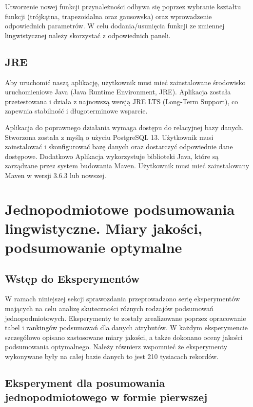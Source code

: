 \documentclass{article}
\begin{document}
\noindent Utworzenie nowej funkcji przynależności odbywa się poprzez wybranie kształtu funkcji (trójkątna, trapezoidalna oraz gausowska) oraz wprowadzenie odpowiednich parametrów. W celu dodania/usunięcia funkcji ze zmiennej lingwistycznej należy skorzystać z odpowiednich paneli.


\subsection{JRE}

\noindent Aby uruchomić naszą aplikację, użytkownik musi mieć zainstalowane środowisko uruchomieniowe Java (Java Runtime Environment, JRE). Aplikacja została przetestowana i działa z najnowszą wersją JRE LTS (Long-Term Support), co zapewnia stabilność i długoterminowe wsparcie.

\noindent Aplikacja do poprawnego działania wymaga dostępu do relacyjnej bazy danych. Stworzona została z myślą o użyciu PostgreSQL 13. Użytkownik musi zainstalować i skonfigurować bazę danych oraz dostarczyć odpowiednie dane dostępowe. Dodatkowo Aplikacja wykorzystuje biblioteki Java, które są zarządzane przez system budowania Maven. Użytkownik musi mieć zainstalowany Maven w wersji 3.6.3 lub nowszej. 


\section{ Jednopodmiotowe podsumowania lingwistyczne. Miary jakości, podsumowanie optymalne}

\subsection{Wstęp do Eksperymentów}

W ramach niniejszej sekcji sprawozdania przeprowadzono serię eksperymentów mających na celu analizę skuteczności różnych rodzajów podsumowań jednopodmiotowych. Eksperymenty te zostały zrealizowane poprzez opracowanie tabel i rankingów podsumowań dla danych atrybutów. W każdym eksperymencie szczegółowo opisano zastosowane miary jakości, a także dokonano oceny jakości podsumowania optymalnego. Należy równierz wspomnieć że eksperymenty wykonywane były na całej bazie danych to jest 210 tysiacach rekordów.

\subsection{Eksperyment dla posumowania jednopodmiotowego w formie pierwszej}
\end{document}
